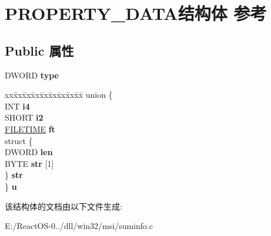 \hypertarget{struct_p_r_o_p_e_r_t_y___d_a_t_a}{}\section{P\+R\+O\+P\+E\+R\+T\+Y\+\_\+\+D\+A\+T\+A结构体 参考}
\label{struct_p_r_o_p_e_r_t_y___d_a_t_a}
\subsection*{Public 属性}
\begin{DoxyCompactItemize}
\item 
\mbox{\label{struct_p_r_o_p_e_r_t_y___d_a_t_a_af0efa43f1b0087824b4b96a6572bf43c}} 
D\+W\+O\+RD {\bfseries type}
\item 
\mbox{\label{struct_p_r_o_p_e_r_t_y___d_a_t_a_acc62960b828ab18c1200ff3af2863994}} 
\begin{tabbing}
xx\=xx\=xx\=xx\=xx\=xx\=xx\=xx\=xx\=\kill
union \{\\
\>INT {\bfseries i4}\\
\>SHORT {\bfseries i2}\\
\>\hyperlink{struct___f_i_l_e_t_i_m_e}{FILETIME} {\bfseries ft}\\
\>struct \{\\
\>\>DWORD {\bfseries len}\\
\>\>BYTE {\bfseries str} \mbox{[}1\mbox{]}\\
\>\} {\bfseries str}\\
\} {\bfseries u}\\

\end{tabbing}\end{DoxyCompactItemize}


该结构体的文档由以下文件生成\+:\begin{DoxyCompactItemize}
\item 
E\+:/\+React\+O\+S-\/0../dll/win32/msi/suminfo.\+c\end{DoxyCompactItemize}

